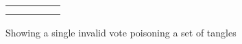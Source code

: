 \begin{figure}
\centering
\begin{tabular}{ c c c c c }
     &  &  \tabularnewline
     &  &  \\
\end{tabular}
\caption{Showing a single invalid vote poisoning a set of tangles}
\label{fig:poisoning}
\end{figure}
